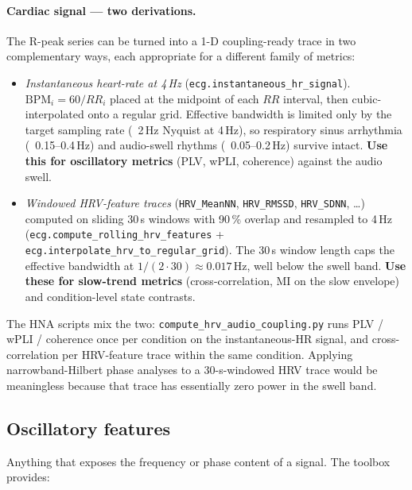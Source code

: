 \documentclass[11pt,a4paper]{article}
\begin{document}
\paragraph{Cardiac signal --- two derivations.} The R-peak series can
be turned into a 1-D coupling-ready trace in two complementary ways,
each appropriate for a different family of metrics:
\begin{itemize}
  \item \emph{Instantaneous heart-rate at 4\,Hz}
        (\texttt{ecg.instantaneous\_hr\_signal}).
        $\mathrm{BPM}_i = 60 / RR_i$ placed at the midpoint of each
        $RR$ interval, then cubic-interpolated onto a regular grid.
        Effective bandwidth is limited only by the target sampling
        rate (~2\,Hz Nyquist at 4\,Hz), so respiratory sinus arrhythmia
        (~0.15--0.4\,Hz) and audio-swell rhythms (~0.05--0.2\,Hz)
        survive intact. \textbf{Use this for oscillatory metrics}
        (PLV, wPLI, coherence) against the audio swell.
  \item \emph{Windowed HRV-feature traces} (\texttt{HRV\_MeanNN},
        \texttt{HRV\_RMSSD}, \texttt{HRV\_SDNN}, \ldots) computed on
        sliding 30\,s windows with 90\,\% overlap and resampled to
        4\,Hz (\texttt{ecg.compute\_rolling\_hrv\_features} +
        \texttt{ecg.interpolate\_hrv\_to\_regular\_grid}). The 30\,s
        window length caps the effective bandwidth at
        $1/(2 \cdot 30) \approx 0.017$\,Hz, well below the swell band.
        \textbf{Use these for slow-trend metrics} (cross-correlation,
        MI on the slow envelope) and condition-level state contrasts.
\end{itemize}
The HNA scripts mix the two: \texttt{compute\_hrv\_audio\_coupling.py}
runs PLV / wPLI / coherence once per condition on the
instantaneous-HR signal, and cross-correlation per HRV-feature trace
within the same condition. Applying narrowband-Hilbert phase analyses
to a 30-s-windowed HRV trace would be meaningless because that trace
has essentially zero power in the swell band.

\subsection{Oscillatory features}

Anything that exposes the frequency or phase content of a signal. The
toolbox provides:
\end{document}
